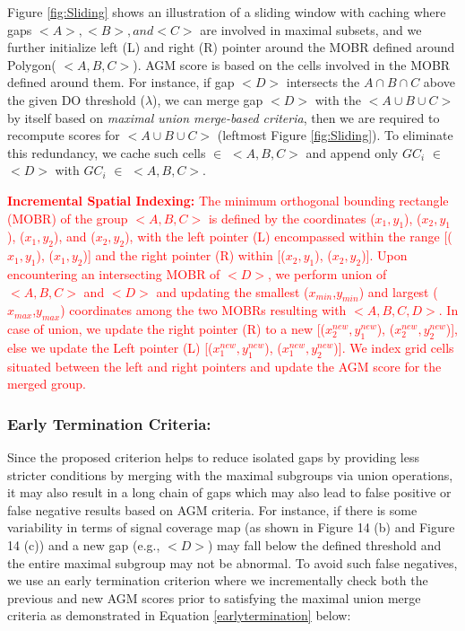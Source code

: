 \documentclass[twoside,leqno,onecolumn]{article}
\begin{document}
Figure \ref{fig:Sliding} shows an illustration of a sliding window with caching where gaps $<A>, <B>, and <C>$ are involved in maximal subsets, and we further initialize left (L) and right (R) pointer around the MOBR defined around Polygon( $<A, B, C>$). AGM score is based on the cells involved in the MOBR defined around them. For instance, if gap $<D>$ intersects the $A \cap B \cap C$ above the given DO threshold ($\lambda$), we can merge gap $<D>$ with the $<A \cup B \cup C>$ by itself based on \textit{maximal union merge-based criteria}, then we are required to recompute scores for $<A \cup B \cup C>$ (leftmost Figure \ref{fig:Sliding}). To eliminate this redundancy, we cache such cells $\in$ $<A,B,C>$ and append only $GC_{i}$ $\in$ $<D>$ with $GC_{i}$ $\in$ $<A,B,C>$.

\textcolor{red}{\textbf{Incremental Spatial Indexing:} The minimum orthogonal bounding rectangle (MOBR) of the group $<A, B, C>$ is defined by the coordinates ($x_{1}, y_{1}$), ($x_{2}, y_{1}$), ($x_{1}, y_{2}$), and ($x_{2}, y_{2}$), with the left pointer (L) encompassed within the range [($x_{1}, y_{1}$), ($x_{1}, y_{2}$)] and the right pointer (R) within [($x_{2}, y_{1}$), ($x_{2}, y_{2}$)]. Upon encountering an intersecting MOBR of $<D>$, we perform union of $<A, B, C>$ and $<D>$ and updating the smallest ($x_{min}$,$y_{min}$) and largest ($x_{max}$,$y_{max}$) coordinates among the two MOBRs resulting with $<A,B,C,D>$. In case of union, we update the right pointer (R) to a new [($x_{2}^{new}, y_{1}^{new}$), ($x_{2}^{new}, y_{2}^{new}$)], else we update the Left pointer (L) [($x_{1}^{new}, y_{1}^{new}$), ($x_{1}^{new}, y_{2}^{new}$)]. We index grid cells situated between the left and right pointers and update the AGM score for the merged group.}

\subsubsection{Early Termination Criteria:}
\label{subsubsection:Caching}

Since the proposed criterion helps to reduce isolated gaps by providing less stricter conditions by merging with the maximal subgroups via union operations, it may also result in a long chain of gaps which may also lead to false positive or false negative results based on AGM criteria. For instance, if there is some variability in terms of signal coverage map (as shown in Figure 14 (b) and Figure 14 (c)) and a new gap (e.g., $<D>$) may fall below the defined threshold and the entire maximal subgroup may not be abnormal. To avoid such false negatives, we use an early termination criterion where we incrementally check both the previous and new AGM scores prior to satisfying the maximal union merge criteria as demonstrated in Equation \ref{earlytermination} below: 
\end{document}
